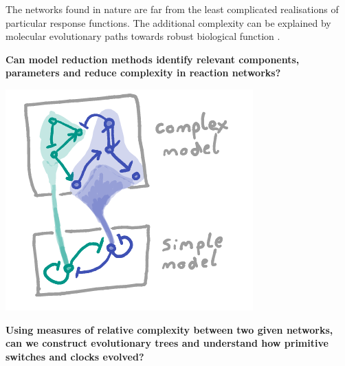 \documentclass[a0,portrait]{a0poster}
\begin{document}
\begin{multicols}{3}
The networks found in nature are far from the least complicated realisations
of particular response functions. The additional complexity can be
explained by molecular evolutionary paths towards robust biological function
\cite{DanielsSloppinessBiology}.
\\
\begin{tcolorbox}[boxrule=2pt,arc=3.4pt,boxsep=2mm]
\begin{center}\color{DarkRed}
\textbf{Can model reduction methods \cite{Cardelli2016NoiseSwitches} identify relevant components,
parameters and reduce complexity in reaction networks?}
\end{center}
\end{tcolorbox}
\begin{center}
\includegraphics[width=0.9\linewidth]{reduction}
\end{center}
\begin{tcolorbox}[boxrule=2pt,arc=3.4pt,boxsep=2mm]
\begin{center}\color{DarkRed}
\textbf{Using measures of relative complexity between two given networks,
can we construct evolutionary trees and understand how primitive switches
and clocks evolved?}
\end{center}
\end{tcolorbox}
\vfill\null
\columnbreak

\end{multicols}
\end{document}
